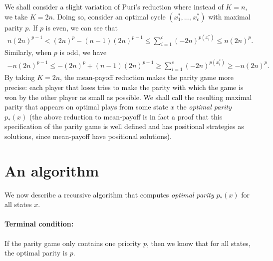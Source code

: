 \documentclass{article}
\begin{document}
We shall consider a slight variation of Puri's reduction where instead of $K=n$, we take $K=2n$. Doing so, consider an optimal cycle $(x^*_1,\dots,x^*_c)$ with maximal parity $p$. If $p$ is even, we can see that
\begin{align}
   n (2n)^{p-1} <  (2n)^{p} - (n-1) (2n)^{p-1} \le  \sum_{i=1}^{c} (-2n)^{p(x^*_i)} \le n (2n)^{p}.
\end{align}
Similarly, when $p$ is odd, we have
\begin{align}
  -n (2n)^{p-1} \le  -(2n)^{p} + (n-1) (2n)^{p-1} \ge \sum_{i=1}^{c} (-2n)^{p(x^*_i)} \ge -n (2n)^{p}.
\end{align}
By taking $K=2n$,  the mean-payoff reduction makes the parity game more precise: each player that loses tries to make the parity with which the game is won by the other player as small as possible. We shall call the resulting maximal parity that appears on optimal plays from some state $x$ the \emph{optimal parity} $p_*(x)$ (the above reduction to mean-payoff is in fact a proof that this specification of the parity game is well defined and has positional strategies as solutions, since mean-payoff have positional solutions).


\section{An algorithm}

We now describe a recursive algorithm that computes \emph{optimal parity} $p_*(x)$ for all states $x$.
\paragraph{Terminal condition:} If the parity game only contains one priority $p$, then we know that for all states, the optimal parity is $p$.
\end{document}
